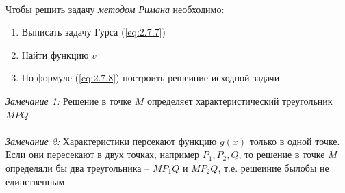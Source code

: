 \documentclass[../main.tex]{subfiles}
\begin{document}
\\
Чтобы решить задачу \textit{методом Римана} необходимо:
\begin{enumerate}
    \item Выписать задачу Гурса (\ref{eq:2.7.7}) 
    \item Найти функцию $v$
    \item По формуле (\ref*{eq:2.7.8}) построить решеиние исходной задачи
\end{enumerate}
\textit{Замечание 1:} Решение в точке $M$ определяет характеристический треугольник $MPQ$\\
\\
\textit{Замечание 2:} Характеристики персекают функцию $g(x)$ только в одной точке.
Если они пересекают в двух точках, например $P_1, P_2, Q$, то решение в точке $M$ 
определяли бы два треугольника -- $MP_1Q$ и $MP_2Q$, т.е. решеиние былобы не единственным.
\end{document}
